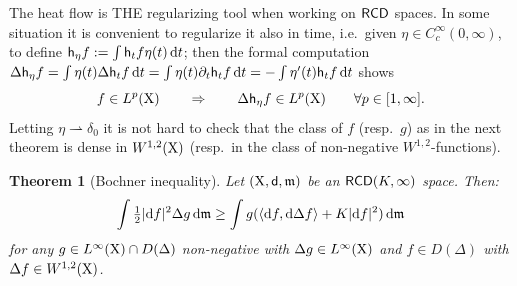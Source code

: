 \documentclass[11pt]{article}
\numberwithin{equation}{section}
\newtheorem{theorem}{Theorem}[section]
\newcommand{\X}{{\rm X}}
\newcommand{\sfd}{{\sf d}}
\newcommand{\mm}{{\mathfrak m}}
\newcommand{\RCD}{{\sf RCD}}
\renewcommand{\d}{{\rm d}}
\newcommand{\weakto}{\rightharpoonup}
\newcommand{\h}{{\sf h}} %
\newcommand\la{\langle}
\newcommand\ra{\rangle}
\begin{document}
The heat flow is THE regularizing tool when working on $\RCD$ spaces. In some situation it is convenient to regularize it also in time, i.e.\ given $\eta\in C^\infty_c(0,\infty)$, to define $\h_\eta f:=\int \h_tf\eta(t)\,\d t$; then the formal computation $\Delta\h_\eta f=\int \eta(t)\Delta\h_tf\,\d t=\int \eta(t)\partial_t\h_tf\,\d t=-\int \eta'(t) \h_tf\,\d t$ shows
\begin{equation}
\label{eq:regheat}
f\in L^p(\X)\qquad\Rightarrow\qquad \Delta\h_\eta f\in L^p(\X)\qquad\forall p\in[1,\infty].
\end{equation}
Letting $\eta\weakto\delta_0$ it is not hard to check that the class of $f$ (resp.\ $g$) as in the next theorem is dense in $W^{1,2}(\X)$ (resp.\ in the class of non-negative $W^{1,2}$-functions).
\begin{theorem}[Bochner inequality]\label{thm:boch}
Let $(\X,\sfd,\mm)$ be an $\RCD(K,\infty)$ space. Then:
\begin{equation}
\label{eq:bochner}
\int \tfrac12|\d f|^2\Delta g\,\d\mm\geq \int g(\la\d f,\d\Delta f\ra+K|\d f|^2)\,\d\mm
\end{equation}
for any $g\in L^\infty(\X)\cap D(\Delta)$ non-negative with $\Delta g\in L^\infty(\X)$ and $f\in D(\Delta)$ with $\Delta f\in W^{1,2}(\X)$.
\end{theorem}
\end{document}
